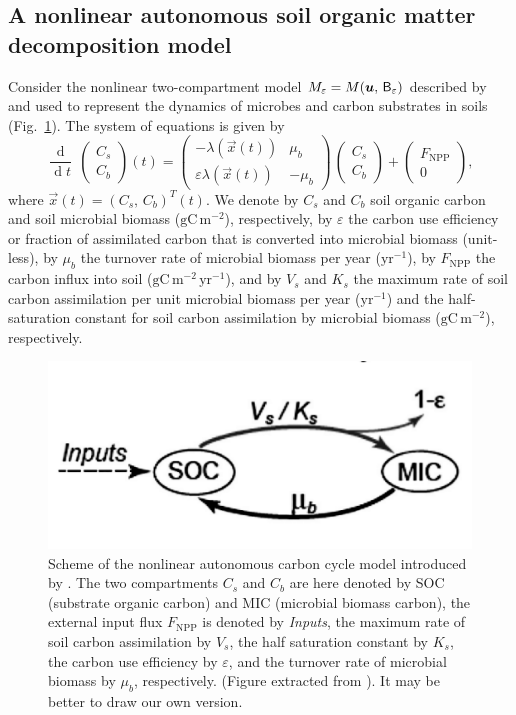 \documentclass[smallextended]{svjour3}
\newcommand{\deriv}[1]{\frac{\operatorname{d}}{\operatorname{d}#1}}
\newcommand{\gC}{\mathrm{gC}}
\newcommand{\yr}{\mathrm{yr}}
\newcommand{\meter}{\mathrm{m}}
\newcommand{\transpose}{T}
\newcommand{\NPP}{\ensuremath{\mathrm{NPP}}}
\begin{document}
\subsection{A nonlinear autonomous soil organic matter decomposition model}
\label{sec:example_2}
Consider the nonlinear two-compartment model $M_\varepsilon=M(\vec{u},\,\tens{B}_\varepsilon)$ described by \citet{Wang2014BG} and used to represent the dynamics of microbes and carbon substrates in soils (Fig.~\ref{fig:Wang_model}). The system of equations is given by
\begin{equation*}
    \deriv{t}\,\begin{pmatrix}C_{s}\\C_{b}\end{pmatrix}(t) = 
    \begin{pmatrix}
      -\lambda(\vec{x}(t)) & \mu_{b}\\
      \varepsilon \lambda(\vec{x}(t)) & - \mu_{b}
    \end{pmatrix}
    \, \begin{pmatrix}C_{s}\\C_{b}\end{pmatrix}
    + \begin{pmatrix}F_{\NPP}\\0\end{pmatrix},
\end{equation*}
where $\vec{x}(t)=(C_{s},\,C_{b})^{\transpose}(t)$.
We denote by $C_s$ and $C_b$ soil organic carbon and soil microbial biomass ($\gC\,\meter^{-2}$), respectively, by $\varepsilon$ the carbon use efficiency or fraction of assimilated carbon that is converted into microbial biomass (unit-less), by $\mu_b$ the turnover rate of microbial biomass per year ($\yr^{-1}$), by $F_{\NPP}$ the carbon influx into soil ($\gC\,\meter^{-2}\,\yr^{-1}$), and by $V_s$ and $K_s$ the maximum rate of soil carbon assimilation per unit microbial biomass per year ($\yr^{-1}$) and the half-saturation constant for soil carbon assimilation by microbial biomass ($\gC\,\meter^{-2}$), respectively.

\begin{figure}[htbp]
    \centering
    \includegraphics[width=0.5\linewidth]{figs/Wang_model.png}
    \caption{Scheme of the nonlinear autonomous carbon cycle model introduced by \citet{Wang2014BG}. 
    The two compartments $C_s$ and $C_b$ are here denoted by SOC (substrate organic carbon) and MIC (microbial biomass carbon), the external input flux $F_{\NPP}$ is denoted by \emph{Inputs}, the maximum rate of soil carbon assimilation by $V_s$, the half saturation constant by $K_s$, the carbon use efficiency by $\varepsilon$, and the turnover rate of microbial biomass by $\mu_b$, respectively.
      (Figure extracted from \citet{Wang2014BG}). \color{blue} It may be better to draw our own version.} \label{fig:Wang_model}
\end{figure}
\end{document}
